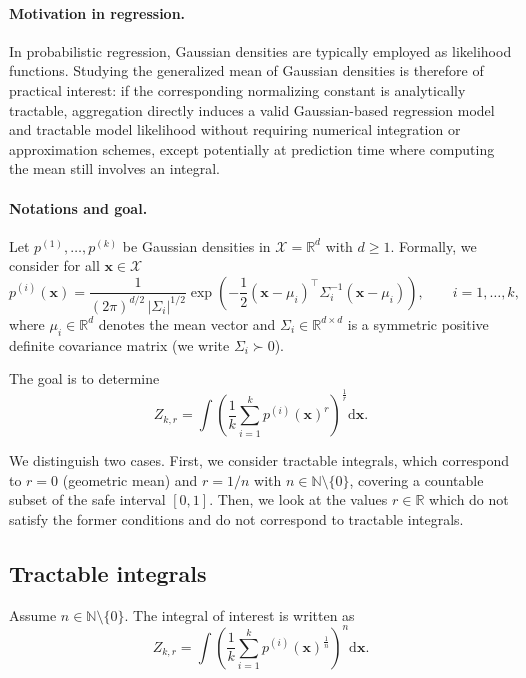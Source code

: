 \documentclass[accepted]{uai2026} %
\newcommand{\R}{\mathbb{R}}
\newcommand{\N}{\mathbb{N}}
\newcommand{\vx}{\mathbf{x}}
\newcommand{\vd}{\mathrm{d}}
\begin{document}
\paragraph{Motivation in regression.}
In probabilistic regression, Gaussian densities are typically employed as likelihood functions. Studying the generalized mean of Gaussian densities is therefore of practical interest: if the corresponding normalizing constant is analytically tractable, aggregation directly induces a valid Gaussian-based regression model and tractable model likelihood without requiring numerical integration or approximation schemes, except potentially at prediction time where computing the mean still involves an integral.

\paragraph{Notations and goal.}
Let $p^{(1)},\dots,p^{(k)}$ be Gaussian densities in $\mathcal{X} = \R^d$ with $d \geq 1$. Formally, we consider for all $\vx \in \mathcal{X}$
\begin{equation}
p^{(i)}(\vx)
=\frac{1}{(2\pi)^{d/2}\,|\Sigma_i|^{1/2}}
\exp\!\left(
-\frac{1}{2}
(\vx-\mu_i)^\top
\Sigma_i^{-1}
(\vx-\mu_i)
\right),
\qquad i=1,\dots,k,
\end{equation}
where $\mu_i \in \R^d$ denotes the mean vector and $\Sigma_i \in \R^{d\times d}$ is a symmetric positive definite covariance matrix (we write $\Sigma_i  \succ 0$).

The goal is to determine 
\begin{equation}
Z_{k,r} = \int \left( \frac{1}{k} \sum_{i=1}^k p^{(i)}(\vx)^r \right)^{\frac{1}{r}} \vd\vx.
\end{equation}

We distinguish two cases. First, we consider tractable integrals, which correspond to $r=0$ (geometric mean) and $r=1/n$ with $n\in\mathbb{N}\setminus{\{0\}}$, covering a countable subset of the safe interval $[0,1]$. Then, we look at the values $r \in \R$ which do not satisfy the former conditions and do not correspond to tractable integrals.


\subsection{Tractable integrals} \label{app: tractable integrals}

Assume $n \in \N \setminus \{0\}$. The integral of interest is written as
\begin{equation}
Z_{k,r} = \int \left( \frac{1}{k} \sum_{i=1}^k p^{(i)}(\vx)^{\frac{1}{n}} \right)^{n} \vd\vx.
\end{equation}
\end{document}
